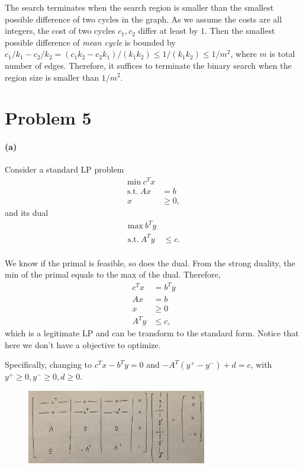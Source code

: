 \documentclass[12pt]{article}
\begin{document}
The search terminates when the search region is smaller than the smallest possible difference of two cycles in the graph. As we assume the costs are all integers, the cost of two cycles $c_1, c_2$ differ at least by $1$. Then the smallest possible difference of \emph{mean cycle} is bounded by $c_1/k_1 - c_2/k_2 = (c_1k_2 - c_2k_1) / (k_1k_2) \leq 1/(k_1k_2) \leq 1/m^2$, where $m$ is total number of edges. Therefore, it suffices to terminate the binary search when the region size is smaller than $1/m^2$.

\pagebreak
\section*{Problem 5}
\paragraph{(a)} Consider a standard LP problem 
\begin{align*}
\text{min} ~ c^Tx& \\
\text{s.t.} ~ Ax &= b\\
x &\geq 0,
\end{align*}
and its dual 
\begin{align*}
\text{max} ~ b^Ty& \\
\text{s.t.} ~ A^Ty &\leq c.\\
\end{align*}

We know if the primal is feasible, so does the dual. From the strong duality, the min of the primal equals to the max of the dual. Therefore,
\begin{align*}
c^Tx &= b^Ty \\
Ax &= b\\
x &\geq 0\\
A^Ty &\leq c,
\end{align*}
which is a legitimate LP and can be transform to the standard form. Notice that here we don't have a objective to optimize.  

Specifically, changing to $c^Tx-b^Ty =0$ and $-A^T(y^+ - y^-) + d = c$, with $y^+ \geq 0, y^- \geq 0, d \geq 0$.
\begin{figure}[h!]
	\centering
	\includegraphics[width=0.7\textwidth]{5-1.jpg}
	\label{fig:5-1}
\end{figure}
\end{document}
